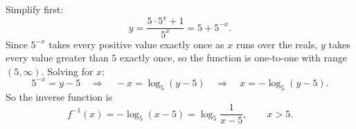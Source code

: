 Simplify first:
\[
y=\dfrac{5\cdot5^x+1}{5^x}=5+5^{-x}.
\]
Since $5^{-x}$ takes every positive value exactly once as $x$ runs over the reals, $y$ takes every value greater than $5$ exactly once, so the function is one-to-one with range $(5,\infty)$. Solving for $x$:
\[
5^{-x}=y-5\quad\Longrightarrow\quad -x=\log_5(y-5)\quad\Longrightarrow\quad x=-\log_5(y-5).
\]
So the inverse function is
\[
\boxed{f^{-1}(x)=-\log_5(x-5)=\log_5\dfrac{1}{x-5},\qquad x>5.}
\]
